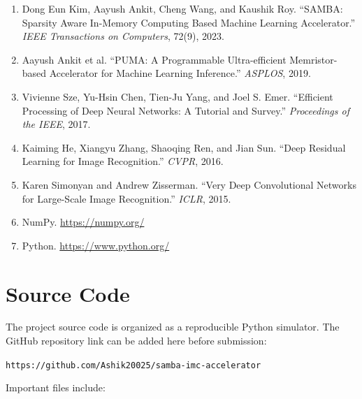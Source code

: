 \documentclass[11pt]{article}
\begin{document}
\begin{enumerate}
    \item Dong Eun Kim, Aayush Ankit, Cheng Wang, and Kaushik Roy. ``SAMBA: Sparsity Aware In-Memory Computing Based Machine Learning Accelerator.'' \textit{IEEE Transactions on Computers}, 72(9), 2023.
    \item Aayush Ankit et al. ``PUMA: A Programmable Ultra-efficient Memristor-based Accelerator for Machine Learning Inference.'' \textit{ASPLOS}, 2019.
    \item Vivienne Sze, Yu-Hsin Chen, Tien-Ju Yang, and Joel S. Emer. ``Efficient Processing of Deep Neural Networks: A Tutorial and Survey.'' \textit{Proceedings of the IEEE}, 2017.
    \item Kaiming He, Xiangyu Zhang, Shaoqing Ren, and Jian Sun. ``Deep Residual Learning for Image Recognition.'' \textit{CVPR}, 2016.
    \item Karen Simonyan and Andrew Zisserman. ``Very Deep Convolutional Networks for Large-Scale Image Recognition.'' \textit{ICLR}, 2015.
    \item NumPy. \url{https://numpy.org/}
    \item Python. \url{https://www.python.org/}
\end{enumerate}

\section{Source Code}

The project source code is organized as a reproducible Python simulator. The GitHub repository link can be added here before submission:

\begin{center}
\texttt{https://github.com/Ashik20025/samba-imc-accelerator}
\end{center}

Important files include:
\end{document}
